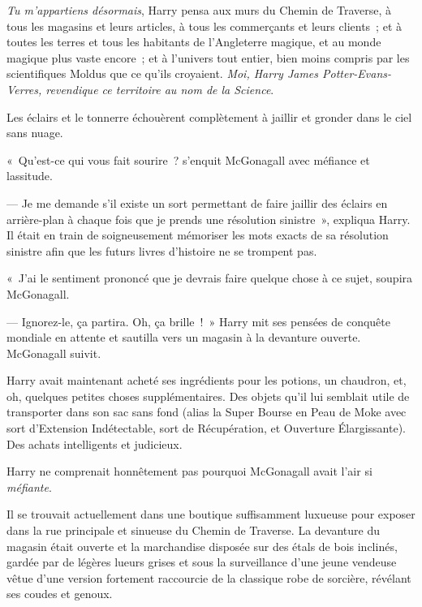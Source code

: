 \emph{Tu m'appartiens désormais}, Harry pensa aux murs du Chemin de Traverse, à tous les magasins et leurs articles, à tous les commerçants et leurs clients~; et à toutes les terres et tous les habitants de l'Angleterre magique, et au monde magique plus vaste encore~; et à l'univers tout entier, bien moins compris par les scientifiques Moldus que ce qu'ils croyaient.
\emph{Moi, Harry James Potter-Evans-Verres, revendique ce territoire au nom de la Science}.

Les éclairs et le tonnerre échouèrent complètement à jaillir et gronder dans le ciel sans nuage.

«~Qu'est-ce qui vous fait sourire~? s'enquit McGonagall avec méfiance et lassitude.

--- Je me demande s'il existe un sort permettant de faire jaillir des éclairs en arrière-plan à chaque fois que je prends une résolution sinistre~», expliqua Harry.
Il était en train de soigneusement mémoriser les mots exacts de sa résolution sinistre afin que les futurs livres d'histoire ne se trompent pas.

«~J'ai le sentiment prononcé que je devrais faire quelque chose à ce sujet, soupira McGonagall.

--- Ignorez-le, ça partira. Oh, ça brille~!~» Harry mit ses pensées de conquête mondiale en attente et sautilla vers un magasin à la devanture ouverte. McGonagall suivit.

\later

Harry avait maintenant acheté ses ingrédients pour les potions, un chaudron, et, oh, quelques petites choses supplémentaires.
Des objets qu'il lui semblait utile de transporter dans son sac sans fond (alias la Super Bourse en Peau de Moke  avec sort d'Extension Indétectable, sort de Récupération, et Ouverture Élargissante).
Des achats intelligents et judicieux.

Harry ne comprenait honnêtement pas pourquoi McGonagall avait l'air si \emph{méfiante}.

Il se trouvait actuellement dans une boutique suffisamment luxueuse pour exposer dans la rue principale et sinueuse du Chemin de Traverse.
La devanture du magasin était ouverte et la marchandise disposée sur des étals de bois inclinés, gardée par de légères lueurs grises et sous la surveillance d'une jeune vendeuse vêtue d’une version fortement raccourcie de la classique robe de sorcière, révélant ses coudes et genoux.

